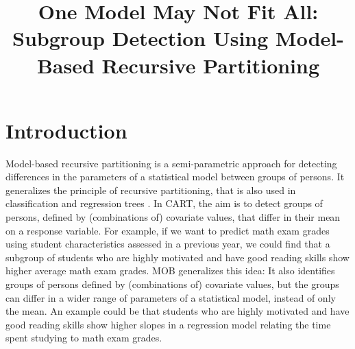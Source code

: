 \documentclass[doc,floatsintext,natbib]{apa7}
\title{One Model May Not Fit All: Subgroup Detection Using Model-Based Recursive Partitioning}
\begin{document}

\renewenvironment{Schunk}{\small}{}


\maketitle



\newpage
\section{Introduction}
\label{sec:Introduction}

Model-based recursive partitioning \citep[MOB;][]{ZeilyHoth08} is a semi-parametric approach for detecting differences in the parameters of a statistical model between groups of persons. It generalizes the principle of recursive partitioning, that is also used in classification and regression trees \citep[CART; ][]{Breetal:1984}. 
In CART, the aim is to detect groups of persons, defined by (combinations of) covariate values, that differ in their mean on a response variable. For example, if we want to predict math exam grades using student characteristics assessed in a previous year, we could find that a subgroup of students who are highly motivated and have good reading skills show higher average math exam grades. 
MOB generalizes this idea: It also identifies groups of persons defined by (combinations of) covariate values, but the groups can differ in a wider range of parameters of a statistical model, instead of only the mean. An example could be that students who are highly motivated and have good reading skills show higher slopes in a regression model relating the time spent studying to math exam grades. 
\end{document}
